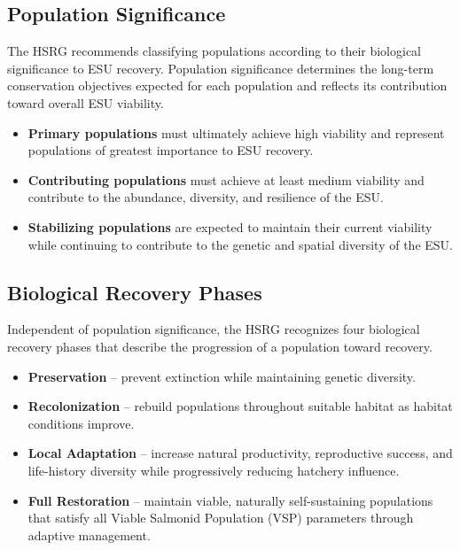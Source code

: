 \documentclass[12pt,letterpaper]{article}
\providecommand{\tightlist}{%
  \setlength{\itemsep}{0pt}\setlength{\parskip}{0pt}}
\begin{document}
\subsection{Population Significance}\label{population-significance}

The HSRG recommends classifying populations according to their biological significance to ESU recovery. Population significance determines the long-term conservation objectives expected for each population and reflects its contribution toward overall ESU viability.

\begin{itemize}
\tightlist
\item
  \textbf{Primary populations} must ultimately achieve high viability and represent populations of greatest importance to ESU recovery.
\item
  \textbf{Contributing populations} must achieve at least medium viability and contribute to the abundance, diversity, and resilience of the ESU.
\item
  \textbf{Stabilizing populations} are expected to maintain their current viability while continuing to contribute to the genetic and spatial diversity of the ESU.
\end{itemize}

\subsection{Biological Recovery Phases}\label{biological-recovery-phases}

Independent of population significance, the HSRG recognizes four biological recovery phases that describe the progression of a population toward recovery.

\begin{itemize}
\tightlist
\item
  \textbf{Preservation} -- prevent extinction while maintaining genetic diversity.
\item
  \textbf{Recolonization} -- rebuild populations throughout suitable habitat as habitat conditions improve.
\item
  \textbf{Local Adaptation} -- increase natural productivity, reproductive success, and life-history diversity while progressively reducing hatchery influence.
\item
  \textbf{Full Restoration} -- maintain viable, naturally self-sustaining populations that satisfy all Viable Salmonid Population (VSP) parameters through adaptive management.
\end{itemize}
\end{document}
